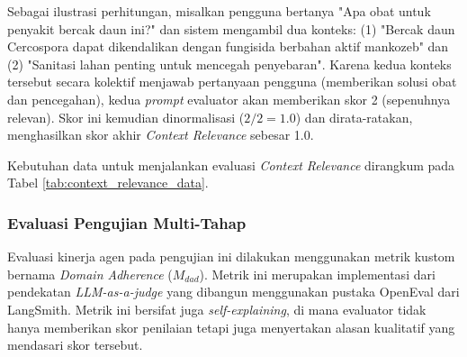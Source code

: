 Sebagai ilustrasi perhitungan, misalkan pengguna bertanya "Apa obat untuk penyakit bercak daun ini?" dan sistem mengambil dua konteks: (1) "Bercak daun Cercospora dapat dikendalikan dengan fungisida berbahan aktif mankozeb" dan (2) "Sanitasi lahan penting untuk mencegah penyebaran". Karena kedua konteks tersebut secara kolektif menjawab pertanyaan pengguna (memberikan solusi obat dan pencegahan), kedua \textit{prompt} evaluator akan memberikan skor 2 (sepenuhnya relevan). Skor ini kemudian dinormalisasi ($2/2 = 1.0$) dan dirata-ratakan, menghasilkan skor akhir \textit{Context Relevance} sebesar 1.0.

Kebutuhan data untuk menjalankan evaluasi \textit{Context Relevance} dirangkum pada Tabel \ref{tab:context_relevance_data}.

\begin{table}[H]
    \centering
    \caption{Kebutuhan Data untuk Evaluasi Context Relevance}
    \label{tab:context_relevance_data}
    \small
\end{table}

\subsubsection{Evaluasi Pengujian Multi-Tahap}
Evaluasi kinerja agen pada pengujian ini dilakukan menggunakan metrik kustom bernama \textit{Domain Adherence} ($M_{dad}$). Metrik ini merupakan implementasi dari pendekatan \textit{LLM-as-a-judge} yang dibangun menggunakan pustaka OpenEval dari LangSmith. Metrik ini bersifat juga \textit{self-explaining}, di mana evaluator tidak hanya memberikan skor penilaian tetapi juga menyertakan alasan kualitatif yang mendasari skor tersebut.

